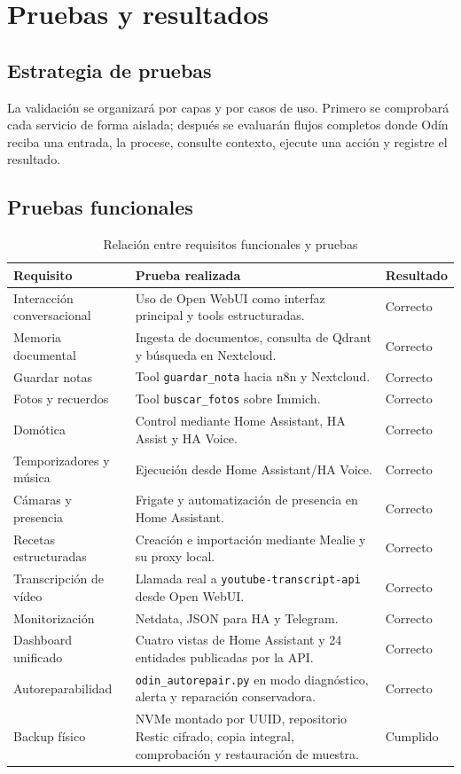 \chapter{Pruebas y resultados}

\section{Estrategia de pruebas}
La validación se organizará por capas y por casos de uso. Primero se comprobará cada servicio de forma aislada; después se evaluarán flujos completos donde Odín reciba una entrada, la procese, consulte contexto, ejecute una acción y registre el resultado.

\section{Pruebas funcionales}
\begin{table}[H]
  \centering
  \caption{Relación entre requisitos funcionales y pruebas}
  \label{tab:rf-pruebas}
  \begin{tabularx}{\textwidth}{lXl}
    \toprule
    Requisito & Prueba realizada & Resultado \\
    \midrule
    Interacción conversacional & Uso de Open WebUI como interfaz principal y tools estructuradas. & Correcto \\
    Memoria documental & Ingesta de documentos, consulta de Qdrant y búsqueda en Nextcloud. & Correcto \\
    Guardar notas & Tool \texttt{guardar\_nota} hacia n8n y Nextcloud. & Correcto \\
    Fotos y recuerdos & Tool \texttt{buscar\_fotos} sobre Immich. & Correcto \\
    Domótica & Control mediante Home Assistant, HA Assist y HA Voice. & Correcto \\
    Temporizadores y música & Ejecución desde Home Assistant/HA Voice. & Correcto \\
    Cámaras y presencia & Frigate y automatización de presencia en Home Assistant. & Correcto \\
    Recetas estructuradas & Creación e importación mediante Mealie y su proxy local. & Correcto \\
    Transcripción de vídeo & Llamada real a \texttt{youtube-transcript-api} desde Open WebUI. & Correcto \\
    Monitorización & Netdata, JSON para HA y Telegram. & Correcto \\
    Dashboard unificado & Cuatro vistas de Home Assistant y 24 entidades publicadas por la API. & Correcto \\
    Autoreparabilidad & \texttt{odin\_autorepair.py} en modo diagnóstico, alerta y reparación conservadora. & Correcto \\
    Backup físico & NVMe montado por UUID, repositorio Restic cifrado, copia integral, comprobación y restauración de muestra. & Cumplido \\
    \bottomrule
  \end{tabularx}
\end{table}

